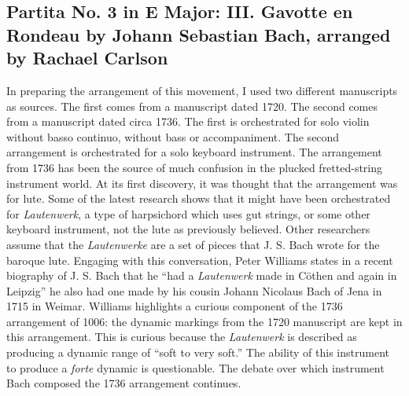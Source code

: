 \documentclass{tufte-handout}
\newcommand{\textls}[2][5]{%
    \begingroup\addfontfeatures{LetterSpace=#1}#2\endgroup
  }
\renewcommand{\smallcapsspacing}[1]{\textls[10]{#1}}
\renewcommand{\textsc}[1]{\smallcapsspacing{\textsmallcaps{#1}}}
\begin{document}
\subsection*{Partita No. 3 in E Major: III. Gavotte en Rondeau by Johann
  Sebastian Bach, arranged by Rachael Carlson} 
\label{sec:partita-no.-3}

In preparing the arrangement of this movement, I used two different
manuscripts as sources. The first comes from a manuscript dated 1720. The
second comes from a manuscript dated circa 1736. The first is orchestrated for
solo violin without basso continuo, without bass or accompaniment. The second
arrangement is orchestrated for a solo keyboard instrument. The arrangement
from 1736 has been the source of much confusion in the plucked fretted-string
instrument world. At its first discovery, it was thought that the arrangement
was for lute. Some of the latest research shows that it might have been
orchestrated for \emph{Lautenwerk}, a type of harpsichord which uses gut
strings, or some other keyboard instrument, not the lute as previously
believed. Other researchers assume that the \emph{Lautenwerke} are a set of
pieces that J. S. Bach wrote for the baroque lute. Engaging with this
conversation, Peter Williams states in a recent biography of J. S. Bach that
he ``had a \emph{Lautenwerk} made in Cöthen and again in Leipzig'' he also had
one made by his cousin Johann Nicolaus Bach of Jena in 1715 in
Weimar. Williams highlights a curious component of the 1736 arrangement of
\textsc{bwv} 1006: the dynamic markings from the 1720 manuscript are kept in
this arrangement. This is curious because the \emph{Lautenwerk} is described
as producing a dynamic range of ``soft to very soft.'' The ability of this
instrument to produce a \emph{forte} dynamic is questionable. The debate over
which instrument Bach composed the 1736 arrangement continues.
\end{document}
